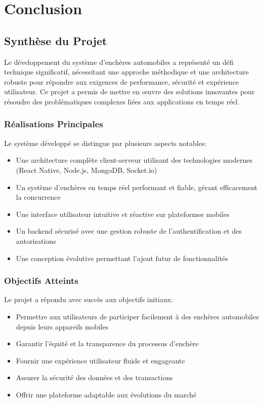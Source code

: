 \chapter{Conclusion}

\section{Synthèse du Projet}

Le développement du système d'enchères automobiles a représenté un défi technique significatif, nécessitant une approche méthodique et une architecture robuste pour répondre aux exigences de performance, sécurité et expérience utilisateur. Ce projet a permis de mettre en œuvre des solutions innovantes pour résoudre des problématiques complexes liées aux applications en temps réel.

\subsection{Réalisations Principales}

Le système développé se distingue par plusieurs aspects notables:

\begin{itemize}
    \item Une architecture complète client-serveur utilisant des technologies modernes (React Native, Node.js, MongoDB, Socket.io)
    \item Un système d'enchères en temps réel performant et fiable, gérant efficacement la concurrence
    \item Une interface utilisateur intuitive et réactive sur plateformes mobiles
    \item Un backend sécurisé avec une gestion robuste de l'authentification et des autorisations
    \item Une conception évolutive permettant l'ajout futur de fonctionnalités
\end{itemize}

\subsection{Objectifs Atteints}

Le projet a répondu avec succès aux objectifs initiaux:

\begin{itemize}
    \item Permettre aux utilisateurs de participer facilement à des enchères automobiles depuis leurs appareils mobiles
    \item Garantir l'équité et la transparence du processus d'enchère
    \item Fournir une expérience utilisateur fluide et engageante
    \item Assurer la sécurité des données et des transactions
    \item Offrir une plateforme adaptable aux évolutions du marché
\end{itemize}


